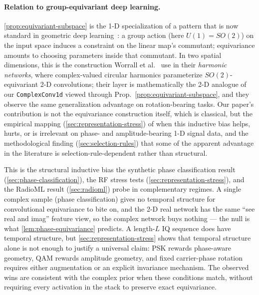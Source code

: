 \documentclass{article}
\providecommand{\Cref}[1]{\autoref{#1}}
\newcommand{\code}[1]{\texttt{#1}}
\begin{document}
\paragraph{Relation to group-equivariant deep learning.}
\Cref{prop:equivariant-subspace} is the 1-D specialization of a
pattern that is now standard in geometric deep
learning~\cite{cohen2016group,bronstein2021geometric}: a group action
(here $U(1) = SO(2)$) on the input space induces a constraint on the
linear map's commutant; equivariance amounts to choosing parameters
inside that commutant. In two spatial dimensions, this is the
construction Worrall et al.~\cite{worrall2017harmonic} use in their
\emph{harmonic networks}, where complex-valued circular harmonics
parameterize $SO(2)$-equivariant 2-D convolutions; their layer is
mathematically the 2-D analogue of our \code{ComplexConv1d} viewed
through Prop.~\ref{prop:equivariant-subspace}, and they observe the
same generalization advantage on rotation-bearing tasks. Our paper's
contribution is not the equivariance construction itself, which is
classical, but the empirical mapping (\Cref{sec:representation-stress})
of when this inductive bias helps, hurts, or is irrelevant on
phase- and amplitude-bearing 1-D signal data, and the methodological
finding (\Cref{sec:selection-rules}) that some of the apparent
advantage in the literature is selection-rule-dependent rather than
structural.

This is the structural inductive bias the synthetic phase
classification result (\Cref{sec:phase-classification}), the RF
stress tests (\Cref{sec:representation-stress}), and the RadioML result
(\Cref{sec:radioml}) probe in complementary regimes. A single complex
sample (phase classification) gives no temporal structure for
convolutional equivariance to bite on, and the 2-D real network has
the same ``see real and imag'' feature view, so the complex network
buys nothing --- the null is what \Cref{lem:phase-equivariance}
predicts. A length-$L$ IQ sequence does have temporal structure, but
\Cref{sec:representation-stress} shows that temporal structure alone
is not enough to justify a universal claim: PSK rewards phase-aware
geometry, QAM rewards amplitude geometry, and fixed carrier-phase
rotation requires either augmentation or an explicit invariance
mechanism. The observed wins are consistent with the complex prior
when these conditions match, without requiring every activation in the
stack to preserve exact equivariance.
\end{document}
